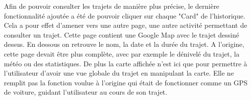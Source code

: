 Afin de pouvoir consulter les trajets de manière plus précise, le dernière fonctionnalité ajoutée a été de pouvoir cliquer sur chaque "Card"
de l'historique. Cela a pour effet d'amener vers une autre page, une autre activité permettant de consulter un trajet. Cette page contient
une Google Map avec le trajet dessiné dessus. En dessous on retrouve le nom, la date et la durée du trajet. A l'origine, cette page devait
être plus complète, avec par exemple le dénivelé du trajet, la météo ou des statistiques. De plus la carte affichée n'est ici que pour
permettre à l'utilisateur d'avoir une vue globale du trajet en manipulant la carte. Elle ne remplit pas la fonction voulue à l'origine
qui était de fonctionner comme un GPS de voiture, guidant l'utilisateur au cours de son trajet.